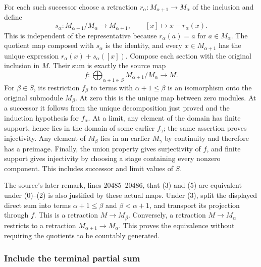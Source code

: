 For each such successor choose a retraction \(r_\alpha:M_{\alpha+1}\to M_\alpha\) of the inclusion and define \[
s_\alpha:M_{\alpha+1}/M_\alpha\longrightarrow M_{\alpha+1},
\qquad [x]\longmapsto x-r_\alpha(x).
\] This is independent of the representative because \(r_\alpha(a)=a\) for \(a\in M_\alpha\). The quotient map composed with \(s_\alpha\) is the identity, and every \(x\in M_{\alpha+1}\) has the unique expression \(r_\alpha(x)+s_\alpha([x])\). Compose each section with the original inclusion in \(M\). Their sum is exactly the source map \[
f:\bigoplus_{\alpha+1\in S}M_{\alpha+1}/M_\alpha\longrightarrow M.
\] For \(\beta\in S\), its restriction \(f_\beta\) to terms with \(\alpha+1\leq\beta\) is an isomorphism onto the original submodule \(M_\beta\). At zero this is the unique map between zero modules. At a successor it follows from the unique decomposition just proved and the induction hypothesis for \(f_\alpha\). At a limit, any element of the domain has finite support, hence lies in the domain of some earlier \(f_\gamma\); the same assertion proves injectivity. Any element of \(M_\beta\) lies in an earlier \(M_\gamma\) by continuity and therefore has a preimage. Finally, the union property gives surjectivity of \(f\), and finite support gives injectivity by choosing a stage containing every nonzero component. This includes successor and limit values of \(S\).

The source's later remark, lines 20485--20486, that (3) and (5) are equivalent under (0)--(2) is also justified by these actual maps. Under (3), split the displayed direct sum into terms \(\alpha+1\leq\beta\) and \(\beta<\alpha+1\), and transport its projection through \(f\). This is a retraction \(M\to M_\beta\). Conversely, a retraction \(M\to M_\alpha\) restricts to a retraction \(M_{\alpha+1}\to M_\alpha\). This proves the equivalence without requiring the quotients to be countably generated.

\subsubsection{Include the terminal partial sum}\label{include-the-terminal-partial-sum}

